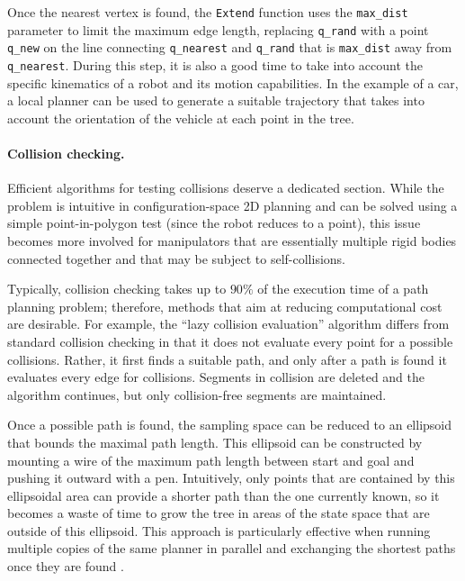 Once the nearest vertex is found, the \texttt{Extend} function uses the \texttt{max\_dist} parameter to limit the maximum edge length, replacing \texttt{q\_rand} with a point \texttt{q\_new} on the line connecting \texttt{q\_nearest} and \texttt{q\_rand} that is \texttt{max\_dist} away from \texttt{q\_nearest}.
%
During this step, it is also a good time to take into account the specific kinematics of a robot and its motion capabilities. In the example of a car, a local planner can be used to generate a suitable trajectory that takes into account the orientation of the vehicle at each point in the tree.

\paragraph{Collision checking.}

Efficient algorithms for testing collisions deserve a dedicated section. While the problem is intuitive in configuration-space 2D planning and can be solved using a simple point-in-polygon test (since the robot reduces to a point), this issue becomes more involved for manipulators that are essentially multiple rigid bodies connected together and that may be subject to self-collisions.

Typically, collision checking takes up to $90\%$ of the execution time of a path planning problem; therefore, methods that aim at reducing computational cost are desirable. For example, the ``lazy collision evaluation'' algorithm differs from standard collision checking in that it does not evaluate every point for a possible collisions. Rather, it first finds a suitable path, and only after a path is found it evaluates every edge for collisions. Segments in collision are deleted and the algorithm continues, but only collision-free segments are maintained.

Once a possible path is found, the sampling space can be reduced to an ellipsoid that bounds the maximal path length. This ellipsoid can be constructed by mounting a wire of the maximum path length between start and goal and pushing it outward with a pen. Intuitively, only points that are contained by this ellipsoidal area can provide a shorter path than the one currently known, so it becomes a waste of time to grow the tree in areas of the state space that are outside of this ellipsoid. This approach is particularly effective when running multiple copies of the same planner in parallel and exchanging the shortest paths once they are found \cite{otte2012}.

